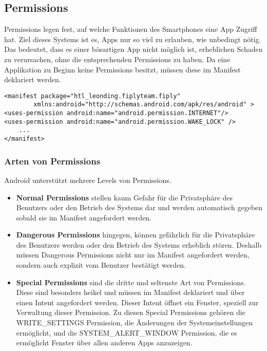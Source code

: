 \documentclass[FIPLY_base.tex]{subfiles}
\begin{document}
\subsection{Permissions}
Permissions legen fest, auf welche Funktionen des Smartphones eine App Zugriff hat.
Ziel dieses Systems ist es, Apps nur so viel zu erlauben, wie unbedingt nötig.
Das bedeutet, dass es einer bösartigen App nicht möglich ist, erheblichen Schaden zu verursachen, ohne die entsprechenden Permissions zu haben.
Da eine Applikation zu Beginn keine Permissions besitzt, müssen diese im Manifest deklariert werden. 
\ \\
\begin{lstlisting}
<manifest package="htl_leonding.fiplyteam.fiply"
		xmlns:android="http://schemas.android.com/apk/res/android" >
<uses-permission android:name="android.permission.INTERNET"/>
<uses-permission android:name="android.permission.WAKE_LOCK" />
	...
</manifest>
\end{lstlisting}


\subsubsection{Arten von Permissions}
Android unterstützt mehrere Levels von Permissions.
\begin{itemize}
\item \textbf{Normal Permissions} stellen kaum Gefahr für die Privatsphäre des Benutzers oder den Betrieb des Systems dar und werden automatisch gegeben sobald sie im Manifest angefordert werden.

\item \textbf{Dangerous Permissions} hingegen, können gefährlich für die Privatsphäre des Benutzers werden oder den Betrieb des Systems erheblich stören. 
Deshalb müssen Dangerous Permissions nicht nur im Manifest angefordert werden, sondern auch explizit vom Benutzer bestätigt werden.

\item \textbf{Special Permissions} sind die dritte und seltenste Art von Permissions. 
Diese sind besonders heikel und müssen im Manifest deklariert und über einen Intent angefordert werden.
Dieser Intent öffnet ein Fenster, speziell zur Verwaltung dieser Permission. \newline
Zu diesen Special Permissions gehören die WRITE\_SETTINGS Permission, die Änderungen der Systemeinstellungen ermöglicht, 
und die SYSTEM\_ALERT\_WINDOW Permission, die es ermöglicht Fenster über allen anderen Apps anzuzeigen.
\end{itemize}
\end{document}

